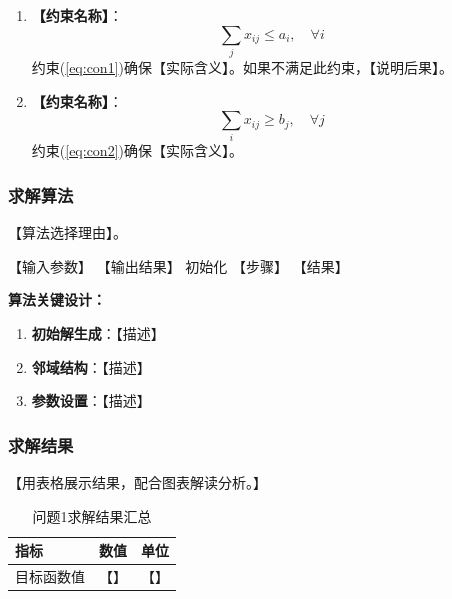 \documentclass[12pt,a4paper]{ctexart}
\numberwithin{equation}{section}
\numberwithin{figure}{section}
\numberwithin{table}{section}
\begin{document}
\begin{enumerate}[label=(\arabic*)]
    \item \textbf{【约束名称】}：
    \begin{equation}\label{eq:con1}
        \sum_{j} x_{ij} \leq a_i, \quad \forall i
    \end{equation}
    约束(\ref{eq:con1})确保【实际含义】。如果不满足此约束，【说明后果】。

    \item \textbf{【约束名称】}：
    \begin{equation}\label{eq:con2}
        \sum_{i} x_{ij} \geq b_j, \quad \forall j
    \end{equation}
    约束(\ref{eq:con2})确保【实际含义】。
\end{enumerate}

\subsubsection{求解算法}

【算法选择理由】。

\begin{algorithm}[H]
\caption{【算法名称】}
\label{alg:1}
\begin{algorithmic}[1]
\REQUIRE 【输入参数】
\ENSURE 【输出结果】
\STATE 初始化
    \STATE 【步骤】
\ENDFOR
\RETURN 【结果】
\end{algorithmic}
\end{algorithm}

\textbf{算法关键设计：}
\begin{enumerate}
    \item \textbf{初始解生成}：【描述】
    \item \textbf{邻域结构}：【描述】
    \item \textbf{参数设置}：【描述】
\end{enumerate}

\subsubsection{求解结果}

【用表格展示结果，配合图表解读分析。】

\begin{table}[H]
\centering
\caption{问题1求解结果汇总}
\label{tab:q1-results}
\begin{tabular}{l|c|c}
\toprule
\textbf{指标} & \textbf{数值} & \textbf{单位} \\
\midrule
目标函数值 & 【】 & 【】 \\
\bottomrule
\end{tabular}
\end{table}
\end{document}
